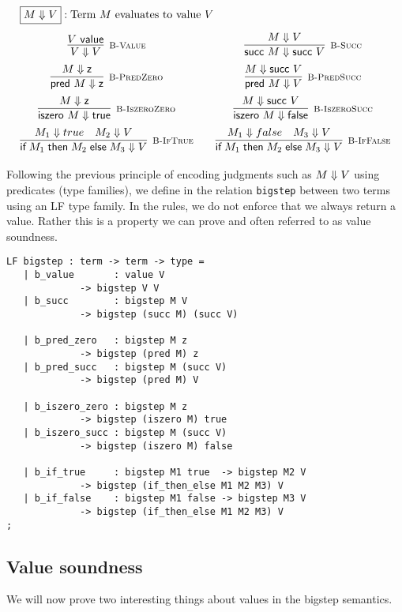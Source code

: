 \[
\begin{array}{c@{\qquad}c}
\multicolumn{2}{l}{\fbox{$M \BSteps V$}: \mbox{Term $M$ evaluates to value $V$}}\\[1em]
  \infer[\BValue]{V \BSteps V}{V \Value} &
  \infer[\BSucc]{\tmsucc M \BSteps \tmsucc V}{M \BSteps V}
\\[0.5em]
  \infer[\BPredZero]{\tmpred M \BSteps \tmzero}{M \BSteps \tmzero} &
  \infer[\BPredSucc]{\tmpred M \BSteps V}{M \BSteps \tmsucc V}
\\[0.5em]
  \infer[\BIszeroZero]{\tmiszero M \BSteps \tmtrue} {M \BSteps \tmzero} &
  \infer[\BIszeroSucc]{\tmiszero M \BSteps \tmfalse}{M \BSteps \tmsucc V}
\\[0.5em]
  \infer[\BIfTrue] {\tmif {M_1}{M_2}{M_3} \BSteps V}{M_1 \BSteps true  & M_2 \BSteps V} &
  \infer[\BIfFalse]{\tmif {M_1}{M_2}{M_3} \BSteps V}{M_1 \BSteps false & M_3 \BSteps V} \\
\end{array}
\]

Following the previous principle of encoding judgments such as $M \Downarrow V$
using predicates (type families), we define in \beluga the relation
\lstinline!bigstep! between two terms using an LF type family. In the rules, we
do not enforce that we always return a value. Rather this is a property we can
prove and often referred to as value soundness.

\begin{lstlisting}
LF bigstep : term -> term -> type =
   | b_value       : value V
		     -> bigstep V V
   | b_succ        : bigstep M V
		     -> bigstep (succ M) (succ V)

   | b_pred_zero   : bigstep M z
		     -> bigstep (pred M) z
   | b_pred_succ   : bigstep M (succ V)
		     -> bigstep (pred M) V

   | b_iszero_zero : bigstep M z
		     -> bigstep (iszero M) true
   | b_iszero_succ : bigstep M (succ V)
		     -> bigstep (iszero M) false

   | b_if_true     : bigstep M1 true  -> bigstep M2 V
		     -> bigstep (if_then_else M1 M2 M3) V
   | b_if_false    : bigstep M1 false -> bigstep M3 V
		     -> bigstep (if_then_else M1 M2 M3) V
;
\end{lstlisting}

\subsection{Value soundness}

We will now prove two interesting things about values in the bigstep semantics.

